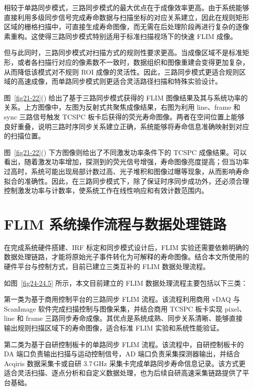 相较于单路同步模式，三路同步模式的最大优点在于成像效率更高。由于系统能够直接利用多级同步信号完成寿命数据与扫描坐标的对应关系建立，因此在规则矩形区域的栅格扫描中，可直接生成寿命图像，而无需在后处理阶段再进行复杂的逐像素重构。这使得三路同步模式特别适用于标准扫描视场下的快速 FLIM 成像。

但与此同时，三路同步模式对扫描方式的规则性要求更高。当成像区域不是标准矩形，或者各扫描行对应的像素数不一致时，数据组织和图像重建会变得更加复杂，从而降低该模式对不规则 ROI 成像的灵活性。因此，三路同步模式更适合规则区域的高速成像，而单路同步模式则更适合灵活路径扫描和特殊实验设计。

图~\ref{fig21-22}() 给出了基于三路同步模式获得的 FLIM 图像结果及其与系统功率的关系。上方图像中，左图为反射式共聚焦成像结果，右图为利用 line、frame 和 sync 三路信号触发 TCSPC 板卡后获得的荧光寿命图像。两者在空间位置上能够良好重叠，说明三路时序同步关系建立正确，系统能够将寿命信息准确映射到对应的扫描位置。

图~\ref{fig21-22}() 下方图像则给出了不同激发功率条件下的 TCSPC 成像结果。可以看出，随着激发功率增加，探测到的荧光信号增强，寿命图像亮度提高；但当功率过高时，系统可能出现局部计数过高、光子堆积和图像过曝等现象，从而影响寿命拟合的准确性。因此，在三路同步模式下，除了保证时序同步成功外，还必须合理控制激发功率与计数率，使系统工作在线性响应和有效计数范围内。





\section{FLIM 系统操作流程与数据处理链路}\label{5.4}

在完成系统硬件搭建、IRF 标定和同步模式设计后，FLIM 实验还需要依赖明确的数据处理链路，才能将原始光子事件转化为可解释的寿命图像。结合本文所使用的硬件平台与控制方式，目前已建立三类互补的 FLIM 数据处理流程。

如图~\ref{fig24-24.5} 所示，本文目前建立的 FLIM 数据处理流程主要包括以下三类：

第一类为基于商用控制平台的三路同步 FLIM 流程。该流程利用商用 vDAQ 与 ScanImage 软件完成扫描控制与图像采集，并结合商用 TCSPC 板卡实现 pixel、line 和 frame 三路同步寿命成像。其优点是系统成熟、同步关系清晰、能够直接输出规则扫描区域下的寿命图像，适合标准 FLIM 实验和系统性能验证。

第二类为基于自研控制板卡的单路同步 FLIM 流程。该流程中，自研控制板卡的 DA 端口负责输出扫描与运动控制信号，AD 端口负责采集探测器输出，并结合 Acqiris 数据采集卡或自研 3.7\,GHz 采集卡完成单路同步寿命信息记录。该方式更适合灵活扫描、逐点分析和自定义数据处理，也为后续自研高速采集链路提供了平台基础。

